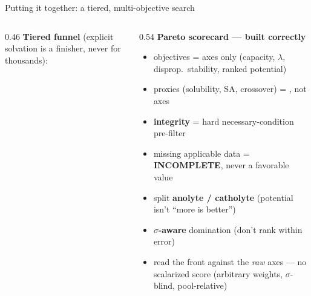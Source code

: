 \begin{frame}{Putting it together: a tiered, multi-objective search}
  \begin{columns}[T]
    \begin{column}{0.46\textwidth}
      \textbf{Tiered funnel} (explicit solvation is a finisher, never for thousands):
      \begin{center}
      \end{center}
    \end{column}
    \begin{column}{0.54\textwidth}
      \textbf{Pareto scorecard --- built correctly}
      \begin{itemize}\footnotesize
        \item objectives =  axes only
              (capacity, $\lambda$, disprop.\ stability, ranked potential)
        \item proxies (solubility, SA, crossover) = , not axes
        \item \textbf{integrity} = hard necessary-condition pre-filter
        \item missing applicable data = \textbf{INCOMPLETE}, never a favorable value
        \item split \textbf{anolyte / catholyte} (potential isn't ``more is better'')
        \item \textbf{$\sigma$-aware} domination (don't rank within error)
        \item read the front against the \emph{raw} axes --- no scalarized score (arbitrary
              weights, $\sigma$-blind, pool-relative)
      \end{itemize}
    \end{column}
  \end{columns}
\end{frame}

